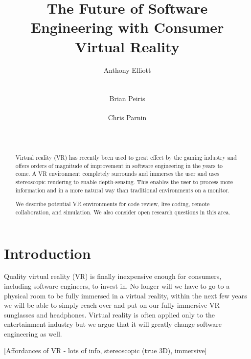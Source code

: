 \documentclass{acm_proc_article-sp}
\begin{document}
\title{The Future of Software Engineering with Consumer Virtual Reality}

\author{
\alignauthor
Anthony Elliott\\
       \\
       \\
\alignauthor
Brian Peiris\\
       \\
\alignauthor
Chris Parnin\\
       \\
       \\
}

\maketitle
\begin{abstract}
Virtual reality (VR) has recently been used to great effect by the gaming industry and offers orders of magnitude of improvement in software engineering in the years to come.
A VR environment completely surrounds and immerses the user and uses stereoscopic rendering to enable depth-sensing. This enables the user to process more information and in a more natural way than traditional environments on a monitor.

We describe potential VR environments for code review, live coding, remote collaboration, and simulation.
We also consider open research questions in this area.
\end{abstract}

\section{Introduction}
Quality virtual reality (VR) is finally inexpensive enough for consumers, including software engineers, to invest in. No longer will we have to go to a physical room to be fully immersed in a virtual reality, within the next few years we will be able to simply reach over and put on our fully immersive VR sunglasses and headphones. Virtual reality is often applied only to the entertainment industry but we argue that it will greatly change software engineering as well. 

[Affordances of VR - lots of info, stereoscopic (true 3D), immersive]
\end{document}
